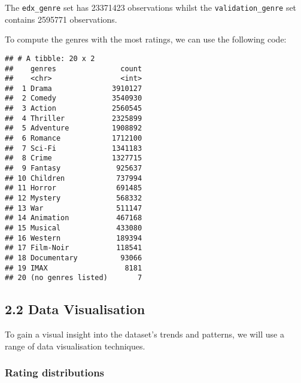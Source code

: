\documentclass[]{article}
\newenvironment{Shaded}{\begin{snugshade}}{\end{snugshade}}
\newcommand{\DataTypeTok}[1]{\textcolor[rgb]{0.13,0.29,0.53}{#1}}
\newcommand{\KeywordTok}[1]{\textcolor[rgb]{0.13,0.29,0.53}{\textbf{#1}}}
\newcommand{\NormalTok}[1]{#1}
\newcommand{\OperatorTok}[1]{\textcolor[rgb]{0.81,0.36,0.00}{\textbf{#1}}}
\newcommand{\StringTok}[1]{\textcolor[rgb]{0.31,0.60,0.02}{#1}}
\begin{document}
The \texttt{edx\_genre} set has 23371423 observations whilst the
\texttt{validation\_genre} set contains 2595771 observations.

To compute the genres with the most ratings, we can use the following
code:

\begin{Shaded}
\end{Shaded}

\begin{verbatim}
## # A tibble: 20 x 2
##    genres               count
##    <chr>                <int>
##  1 Drama              3910127
##  2 Comedy             3540930
##  3 Action             2560545
##  4 Thriller           2325899
##  5 Adventure          1908892
##  6 Romance            1712100
##  7 Sci-Fi             1341183
##  8 Crime              1327715
##  9 Fantasy             925637
## 10 Children            737994
## 11 Horror              691485
## 12 Mystery             568332
## 13 War                 511147
## 14 Animation           467168
## 15 Musical             433080
## 16 Western             189394
## 17 Film-Noir           118541
## 18 Documentary          93066
## 19 IMAX                  8181
## 20 (no genres listed)       7
\end{verbatim}

\hypertarget{data-visualisation-1}{%
\subsection{2.2 Data Visualisation}\label{data-visualisation-1}}

To gain a visual insight into the dataset's trends and patterns, we will
use a range of data visualisation techniques.

\hypertarget{rating-distributions}{%
\subsubsection{Rating distributions}\label{rating-distributions}}
\end{document}
